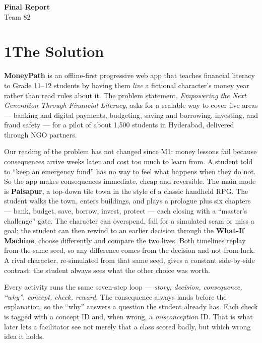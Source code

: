 \documentclass[10pt,a4paper]{article}
\begin{document}
\begin{center}
  {\LARGE\bfseries Final Report}\\[4pt]
  {\large Team 82}
\end{center}
\vspace{-2pt}

\section*{1\quad The Solution}

\textbf{MoneyPath} is an offline-first progressive web app that teaches financial literacy to Grade 11--12 students by having them \emph{live} a fictional character's money year rather than read rules about it. The problem statement, \emph{Empowering the Next Generation Through Financial Literacy}, asks for a scalable way to cover five areas --- banking and digital payments, budgeting, saving and borrowing, investing, and fraud safety --- for a pilot of about 1{,}500 students in Hyderabad, delivered through NGO partners.

Our reading of the problem has not changed since M1: money lessons fail because consequences arrive weeks later and cost too much to learn from. A student told to ``keep an emergency fund'' has no way to feel what happens when they do not. So the app makes consequences immediate, cheap and reversible. The main mode is \textbf{Paisapur}, a top-down tile town in the style of a classic handheld RPG. The student walks the town, enters buildings, and plays a prologue plus six chapters --- bank, budget, save, borrow, invest, protect --- each closing with a ``master's challenge'' gate. The character can overspend, fall for a simulated scam or miss a goal; the student can then rewind to an earlier decision through the \textbf{What-If Machine}, choose differently and compare the two lives. Both timelines replay from the same seed, so any difference comes from the decision and not from luck. A rival character, re-simulated from that same seed, gives a constant side-by-side contrast: the student always sees what the other choice was worth.

Every activity runs the same seven-step loop --- \emph{story, decision, consequence, ``why'', concept, check, reward}. The consequence always lands before the explanation, so the ``why'' answers a question the student already has. Each check is tagged with a concept ID and, when wrong, a \emph{misconception} ID. That is what later lets a facilitator see not merely that a class scored badly, but which wrong idea it holds.
\end{document}
